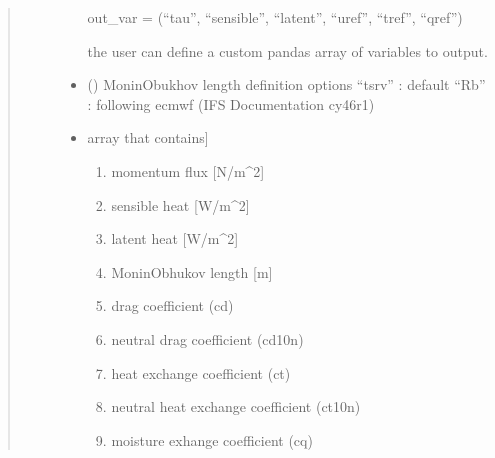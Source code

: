 \documentclass[letterpaper,10pt,english]{sphinxmanual}
\begin{document}
\begin{fulllineitems}
\begin{quote}
\begin{description}
\begin{itemize}
\begin{quote}
\begin{description}
\end{description}
\end{quote}
\begin{description}
\sphinxAtStartPar
out\_var = (“tau”, “sensible”, “latent”, “uref”, “tref”, “qref”)

\end{description}

\sphinxAtStartPar
the user can define a custom pandas array of variables to  output.


\item {} 
\sphinxAtStartPar
{} () \textendash{} Monin\sphinxhyphen{}Obukhov length definition options
“tsrv”  : default
“Rb” : following ecmwf (IFS Documentation cy46r1)

\end{itemize}

\sphinxAtStartPar
\begin{itemize}
\item {} \begin{description}
\sphinxlineitem{res}{[}array that contains{]}\begin{enumerate}
%
\item {} 
\sphinxAtStartPar
momentum flux       {[}N/m\textasciicircum{}2{]}

\item {} 
\sphinxAtStartPar
sensible heat       {[}W/m\textasciicircum{}2{]}

\item {} 
\sphinxAtStartPar
latent heat         {[}W/m\textasciicircum{}2{]}

\item {} 
\sphinxAtStartPar
Monin\sphinxhyphen{}Obhukov length {[}m{]}

\item {} 
\sphinxAtStartPar
drag coefficient (cd)

\item {} 
\sphinxAtStartPar
neutral drag coefficient (cd10n)

\item {} 
\sphinxAtStartPar
heat exchange coefficient (ct)

\item {} 
\sphinxAtStartPar
neutral heat exchange coefficient (ct10n)

\item {} 
\sphinxAtStartPar
moisture exhange coefficient (cq)


\end{enumerate}
\end{description}
\end{itemize}
\end{description}
\end{quote}
\end{fulllineitems}
\end{document}
